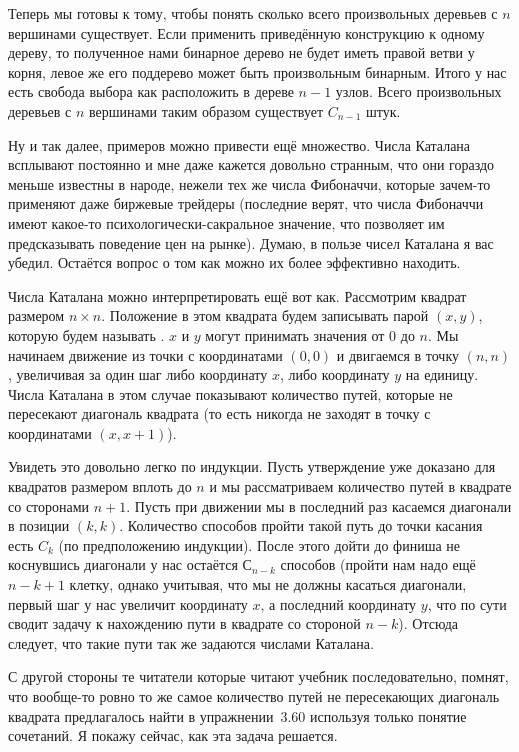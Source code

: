 Теперь мы готовы к тому, чтобы понять сколько всего произвольных деревьев с $n$ вершинами существует. Если применить приведённую конструкцию к одному дереву, то полученное нами бинарное дерево не будет иметь правой ветви у корня, левое же его поддерево может быть произвольным бинарным. Итого у нас есть свобода выбора как расположить в дереве $n-1$ узлов. Всего произвольных деревьев с $n$ вершинами таким образом существует $C_{n-1}$ штук.

Ну и так далее, примеров можно привести ещё множество. Числа Каталана всплывают постоянно и мне даже кажется довольно странным, что они гораздо меньше известны в народе, нежели тех же числа Фибоначчи, которые зачем-то применяют даже биржевые трейдеры (последние верят, что числа Фибоначчи имеют какое-то психологически-сакральное значение, что позволяет им предсказывать поведение цен на рынке). Думаю, в пользе чисел Каталана я вас убедил. Остаётся вопрос о том как можно их более эффективно находить.

Числа Каталана можно интерпретировать ещё вот как. Рассмотрим квадрат размером $n\times n$. Положение в этом квадрата будем записывать парой $(x, y)$, которую будем называть . $x$ и $y$ могут принимать значения от 0 до $n$. Мы начинаем движение из точки с координатами $(0, 0)$ и двигаемся в точку $(n, n)$, увеличивая за один шаг либо координату $x$, либо координату $y$ на единицу. Числа Каталана в этом случае показывают количество путей, которые не пересекают диагональ квадрата (то есть никогда не заходят в точку с координатами $(x, x+1)$).

Увидеть это довольно легко по индукции. Пусть утверждение уже доказано для квадратов размером вплоть до $n$ и мы рассматриваем количество путей в квадрате со сторонами $n+1$. Пусть при движении мы в последний раз касаемся диагонали в позиции $(k, k)$. Количество способов пройти такой путь до точки касания есть $C_k$ (по предположению индукции). После этого дойти до финиша не коснувшись диагонали у нас остаётся $С_{n-k}$ способов (пройти нам надо ещё $n-k+1$ клетку, однако учитывая, что мы не должны касаться диагонали, первый шаг у нас увеличит координату $x$, а последний координату $y$, что по сути сводит задачу к нахождению пути в квадрате со стороной $n-k$). Отсюда следует, что такие пути так же задаются числами Каталана.

С другой стороны те читатели которые читают учебник последовательно, помнят, что вообще-то ровно то же самое количество путей не пересекающих диагональ квадрата предлагалось найти в упражнении~3.60 используя только понятие сочетаний. Я покажу сейчас, как эта задача решается.


